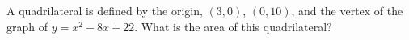 A quadrilateral is defined by the origin, $(3, 0)$, $(0, 10)$, and the vertex of the graph of $y = x^2 -8x+22$. What is the area of this quadrilateral?
